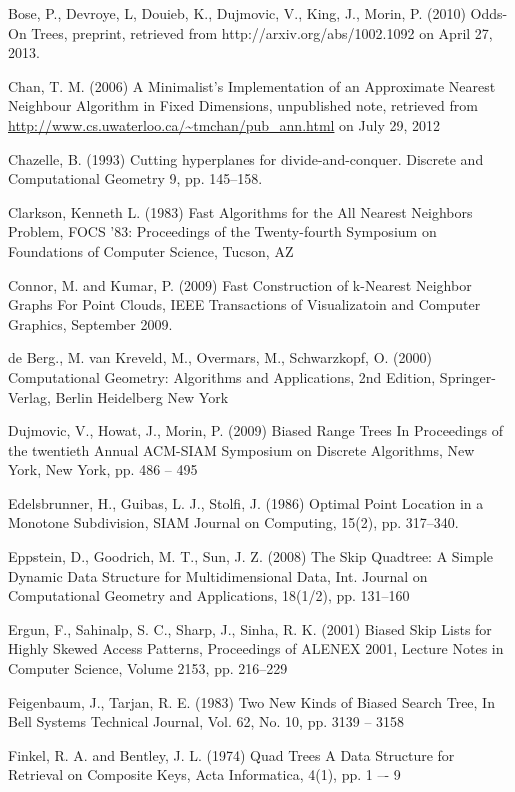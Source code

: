\documentclass[mcs]{scsthesis}
\begin{document}
\begin{thebibliography}{5}
Bose, P., Devroye, L, Douieb, K., Dujmovic, V., King, J., Morin, P. (2010)
Odds-On Trees, preprint, retrieved from http://arxiv.org/abs/1002.1092 on
April 27, 2013.

Chan, T. M. (2006) A Minimalist's Implementation of an Approximate Nearest
Neighbour Algorithm in Fixed Dimensions, unpublished note, retrieved from
\url{http://www.cs.uwaterloo.ca/~tmchan/pub\_ann.html} on July 29, 2012

 Chazelle, B. (1993) Cutting hyperplanes for divide-and-conquer.
Discrete and Computational Geometry 9, pp. 145--158.

Clarkson, Kenneth L. (1983) Fast Algorithms for the All Nearest Neighbors Problem,
FOCS '83: Proceedings of the Twenty-fourth Symposium on Foundations of
Computer Science, Tucson, AZ 

Connor, M. and Kumar, P. (2009) Fast Construction of k-Nearest Neighbor Graphs
For Point Clouds, IEEE Transactions of Visualizatoin and Computer Graphics,
September 2009.

de Berg., M. van Kreveld, M., Overmars, M., Schwarzkopf, O. (2000)
Computational Geometry: Algorithms and Applications, 2nd Edition, Springer-Verlag,
Berlin Heidelberg New York

Dujmovic, V., Howat, J., Morin, P. (2009) Biased Range Trees
In Proceedings of the twentieth Annual ACM-SIAM Symposium on Discrete Algorithms,
New York, New York, pp. 486 -- 495

Edelsbrunner, H., Guibas, L. J., Stolfi, J. (1986) Optimal Point Location in a
Monotone Subdivision, SIAM Journal on Computing, 15(2), pp. 317--340. 

Eppstein, D., Goodrich, M. T., Sun, J. Z. (2008) The Skip Quadtree: A Simple
Dynamic Data Structure for Multidimensional Data, Int. Journal on Computational
Geometry and Applications, 18(1/2), pp. 131--160 

Ergun, F., Sahinalp, S. C., Sharp, J., Sinha, R. K. (2001) Biased Skip Lists
for Highly Skewed Access Patterns, Proceedings of ALENEX 2001, Lecture Notes in
Computer Science, Volume 2153, pp. 216--229 

Feigenbaum, J., Tarjan, R. E. (1983) Two New Kinds of Biased Search Tree,
In Bell Systems Technical Journal, Vol. 62, No. 10, pp. 3139 -- 3158

Finkel, R. A. and Bentley, J. L. (1974) Quad Trees A Data Structure for
Retrieval on Composite Keys, Acta Informatica, 4(1), pp. 1 –- 9 


\end{thebibliography}
\end{document}
